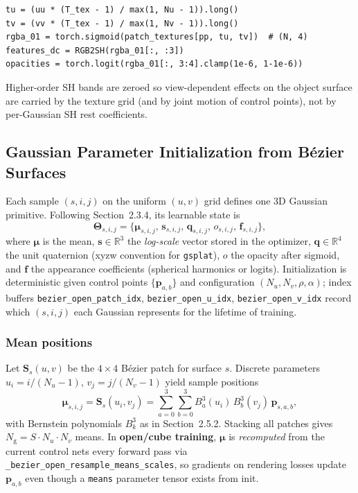 \documentclass{report}
\begin{document}
\begin{lstlisting}[caption={Texture lookup in \texttt{get\_outputs} (open/cube mode).},label={lst:texture_override}]
tu = (uu * (T_tex - 1) / max(1, Nu - 1)).long()
tv = (vv * (T_tex - 1) / max(1, Nv - 1)).long()
rgba_01 = torch.sigmoid(patch_textures[pp, tu, tv])  # (N, 4)
features_dc = RGB2SH(rgba_01[:, :3])
opacities = torch.logit(rgba_01[:, 3:4].clamp(1e-6, 1-1e-6))
\end{lstlisting}

Higher-order SH bands are zeroed so view-dependent effects on the object surface are carried by the texture grid (and by joint motion of control points), not by per-Gaussian SH rest coefficients.

\subsection{Gaussian Parameter Initialization from B\'ezier Surfaces}
\label{subsec:gaussian_init}

Each sample $(s,i,j)$ on the uniform $(u,v)$ grid defines one 3D Gaussian primitive. Following Section~2.3.4, its learnable state is
\[
\boldsymbol{\Theta}_{s,i,j}=
\bigl\{
\boldsymbol{\mu}_{s,i,j},\,
\mathbf{s}_{s,i,j},\,
\mathbf{q}_{s,i,j},\,
o_{s,i,j},\,
\mathbf{f}_{s,i,j}
\bigr\},
\]
where $\boldsymbol{\mu}$ is the mean, $\mathbf{s}\in\mathbb{R}^3$ the \emph{log-scale} vector stored in the optimizer, $\mathbf{q}\in\mathbb{R}^4$ the unit quaternion (xyzw convention for \texttt{gsplat}), $o$ the opacity after sigmoid, and $\mathbf{f}$ the appearance coefficients (spherical harmonics or logits). Initialization is deterministic given control points $\{\mathbf{p}_{a,b}\}$ and configuration $(N_u,N_v,\rho,\alpha)$; index buffers \texttt{bezier\_open\_patch\_idx}, \texttt{bezier\_open\_u\_idx}, \texttt{bezier\_open\_v\_idx} record which $(s,i,j)$ each Gaussian represents for the lifetime of training.

\subsubsection{Mean positions}
\label{subsubsec:init_means}

Let $\mathbf{S}_s(u,v)$ be the $4\times 4$ B\'ezier patch for surface $s$. Discrete parameters $u_i=i/(N_u-1)$, $v_j=j/(N_v-1)$ yield sample positions
\begin{equation}
\boldsymbol{\mu}_{s,i,j}=\mathbf{S}_s(u_i,v_j)
=\sum_{a=0}^{3}\sum_{b=0}^{3} B_a^{3}(u_i)\,B_b^{3}(v_j)\,\mathbf{p}_{s,a,b},
\label{eq:gaussian_mean_bezier}
\end{equation}
with Bernstein polynomials $B_k^{3}$ as in Section~2.5.2. Stacking all patches gives $N_{\mathrm{g}}=S\cdot N_u\cdot N_v$ means. In \textbf{open/cube training}, $\boldsymbol{\mu}$ is \emph{recomputed} from the current control nets every forward pass via \texttt{\_bezier\_open\_resample\_means\_scales}, so gradients on rendering losses update $\mathbf{p}_{a,b}$ even though a \texttt{means} parameter tensor exists from init.
\end{document}

